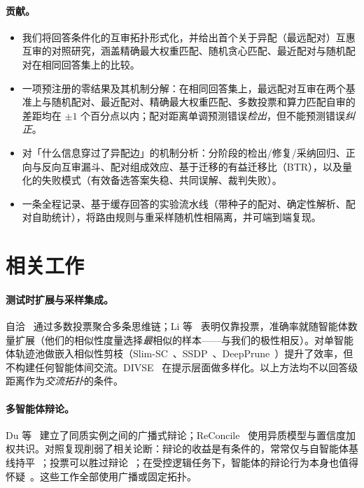 \documentclass[UTF8,11pt]{ctexart}
\begin{document}
\paragraph{贡献。}
\begin{itemize}
\item 我们将回答条件化的互审拓扑形式化，并给出首个关于异配（最远配对）互惠互审的对照研究，涵盖精确最大权重匹配、随机贪心匹配、最近配对与随机配对在相同回答集上的比较。
\item 一项预注册的零结果及其机制分解：在相同回答集上，最远配对互审在两个基准上与随机配对、最近配对、精确最大权重匹配、多数投票和算力匹配自审的差距均在 $\pm 1$ 个百分点以内；配对距离单调预测错误\emph{检出}，但不能预测错误\emph{纠正}。
\item 对「什么信息穿过了异配边」的机制分析：分阶段的检出/修复/采纳回归、正向与反向互审漏斗、配对组成效应、基于迁移的有益迁移比（BTR），以及量化的失败模式（有效备选答案失稳、共同误解、裁判失败）。
\item 一条全程记录、基于缓存回答的实验流水线（带种子的配对、确定性解析、配对自助统计），将路由规则与重采样随机性相隔离，并可端到端复现。
\end{itemize}

\section{相关工作}
\label{sec:related}

\paragraph{测试时扩展与采样集成。}
自洽~\cite{wang2022selfconsistency} 通过多数投票聚合多条思维链；Li 等~\cite{li2024moreagents} 表明仅靠投票，准确率就随智能体数量扩展（他们的相似性度量选择\emph{最}相似的样本——与我们的极性相反）。对单智能体轨迹池做嵌入相似性剪枝（Slim-SC~\cite{slimsc}、SSDP~\cite{ssdp}、DeepPrune~\cite{deepprune}）提升了效率，但不构建任何智能体间交流。DIVSE~\cite{divse} 在提示层面做多样化。以上方法均不以回答级距离作为\emph{交流拓扑}的条件。

\paragraph{多智能体辩论。}
Du 等~\cite{du2023multiagent} 建立了同质实例之间的广播式辩论；ReConcile~\cite{chen2023reconcile} 使用异质模型与置信度加权共识。对照复现削弱了相关论断：辩论的收益是有条件的，常常仅与自智能体基线持平~\cite{yang2025revisiting}；投票可以胜过辩论~\cite{choi2025debateorvote}；在受控逻辑任务下，智能体的辩论行为本身也值得怀疑~\cite{wu2025reallydebate}。这些工作全部使用广播或固定拓扑。
\end{document}

